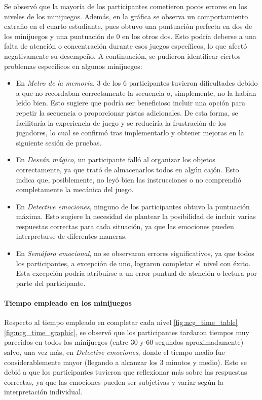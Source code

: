 Se observó que la mayoría de los participantes cometieron pocos errores en los niveles de los minijuegos.
Además, en la gráfica se observa un comportamiento extraño en el cuarto estudiante, pues obtuvo una puntuación perfecta en dos de los minijuegos y una puntuación de 0 en los otros dos.
Esto podría deberse a una falta de atención o concentración durante esos juegos específicos, lo que afectó negativamente su desempeño.
A continuación, se pudieron identificar ciertos problemas específicos en algunos minijuegos:
\begin{itemize}
    \item En \textit{Metro de la memoria}, 3 de los 6 participantes tuvieron dificultades debido a que no recordaban correctamente la secuencia o, simplemente, no la habían leído bien.
    Esto sugiere que podría ser beneficioso incluir una opción para repetir la secuencia o proporcionar pistas adicionales.
    De esta forma, se facilitaría la experiencia de juego y se reduciría la frustración de los jugadores, lo cual se confirmó tras implementarlo y obtener mejoras en la siguiente sesión de pruebas.
    \item En \textit{Desván mágico}, un participante falló al organizar los objetos correctamente, ya que trató de almacenarlos todos en algún cajón.
    Esto indica que, posiblemente, no leyó bien las instrucciones o no comprendió completamente la mecánica del juego.
    \item En \textit{Detective emociones}, ninguno de los participantes obtuvo la puntuación máxima.
    Esto sugiere la necesidad de plantear la posibilidad de incluir varias respuestas correctas para cada situación, ya que las emociones pueden interpretarse de diferentes maneras.
    \item En \textit{Semáforo emocional}, no se observaron errores significativos, ya que todos los participantes, a excepción de uno, lograron completar el nivel con éxito.
    Esta excepción podría atribuirse a un error puntual de atención o lectura por parte del participante.    
\end{itemize}

\paragraph{Tiempo empleado en los minijuegos}
Respecto al tiempo empleado en completar cada nivel \cref{fig:ncg_time_table} \cref{fig:ncg_time_graphic}, se observó que los participantes tardaron tiempos muy parecidos en todos los minijuegos (entre 30 y 60 segundos aproximadamente) salvo, una vez más, en \textit{Detective emociones}, donde el tiempo medio fue considerablemente mayor (llegando a alcanzar los 3 minutos y medio).
Esto se debió a que los participantes tuvieron que reflexionar más sobre las respuestas correctas, ya que las emociones pueden ser subjetivas y variar según la interpretación individual.

